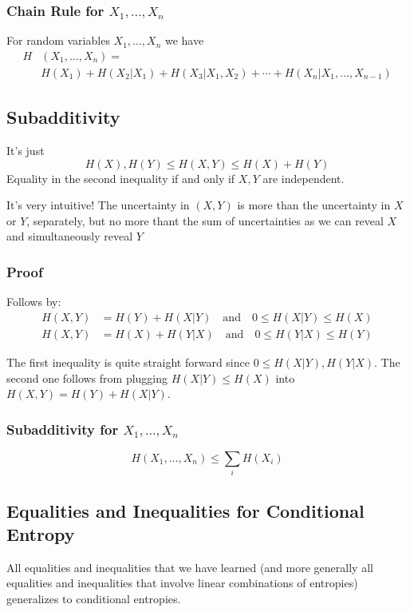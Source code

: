 \documentclass{article}
\begin{document}
\subsubsection{Chain Rule for $X_1,\ldots,X_n$}
For random variables $X_1,\ldots,X_n$ we have 
\begin{align*}
    H&(X_1,\ldots,X_n)=\\
    &H(X_1) + H(X_2|X_1) + H(X_3|X_1,X_2) + \cdots + H(X_n|X_1,\ldots,X_{n-1})
\end{align*}

\subsection{Subadditivity}
It's just 
\[
H(X),H(Y)\leq H(X,Y)\leq H(X) + H(Y)
\]
Equality in the second inequality if and only if $X,Y$ are independent.

It's very intuitive! The uncertainty in $(X,Y)$ is more than the uncertainty in $X$ or $Y$, separately, but no more thant the sum of uncertainties as we can reveal $X$ and simultaneously reveal $Y$

\subsubsection{Proof}

Follows by:
\begin{align*}
    H(X,Y) &= H(Y) + H(X|Y) \quad \text{and}\quad 0\leq H(X|Y) \leq H(X)\\
    H(X,Y) &= H(X) + H(Y|X) \quad \text{and}\quad 0\leq H(Y|X) \leq H(Y)
\end{align*}

The first inequality is quite straight forward since $0\leq H(X|Y),H(Y|X)$. The second one follows from plugging $ H(X|Y) \leq H(X)$ into $H(X,Y) = H(Y) + H(X|Y)$.

\subsubsection{Subadditivity for $X_1,\ldots, X_n$}

\[
H(X_1,\ldots,X_n)\leq \sum_i H(X_i)
\]

\subsection{Equalities and Inequalities for Conditional Entropy}

All equalities and inequalities that we have learned (and more generally all equalities and inequalities that involve linear combinations of entropies) generalizes to conditional entropies.
\end{document}
